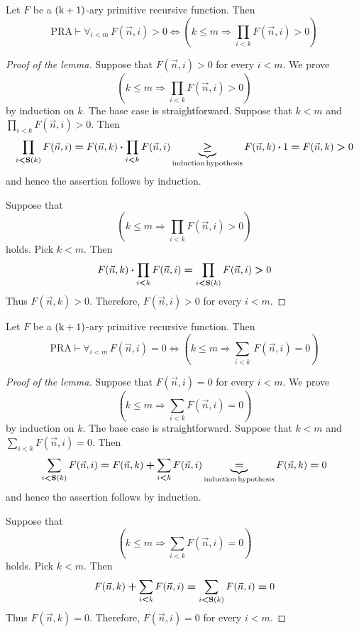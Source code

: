 \documentclass[10pt]{amsart}
\newcommand{\mforall}{\boldsymbol{\forall}}
\newcommand{\mra}{\boldsymbol{\Rightarrow}}
\newcommand{\mequiv}{\boldsymbol{\Leftrightarrow}}
\newcommand{\mle}{\boldsymbol{<}}
\newcommand{\mge}{\boldsymbol{>}}
\newcommand{\mleq}{\boldsymbol{\leq}}
\newcommand{\mgeq}{\boldsymbol{\geq}}
\newcommand{\meq}{\boldsymbol{=}}
\newcommand{\mplus}{\boldsymbol{+}}
\newcommand{\mdot}{\boldsymbol{\cdot}}
\begin{document}
\begin{lemma}\label{lemma:bounded_universal_quantifiers_and_cummulative_products}
	Let $F$ be a $\rm{(k + 1)}$-ary primitive recursive function. Then
  $$\mathrm{PRA}\vdash \mforall_{i \mle m}\,F(\vec{n},i) \mge 0 \mequiv \left(k \mleq m \mra \prod_{i \mle k}F(\vec{n},i) \mge 0\right)$$
\end{lemma}
\begin{proof}[Proof of the lemma]
	Suppose that $F(\vec{n},i) \mge 0$ for every $i \mle m$. We prove
	$$\left(k \mleq m \mra \prod_{i \mle k}F(\vec{n},i) \mge 0\right)$$
	by induction on $k$. The base case is straightforward. Suppose that $k \mle m$ and $\prod_{i \mle k}F(\vec{n},i) \mge 0$. Then
	$$\prod_{i \mle \bd{S}(k)}F(\vec{n},i) \meq F(\vec{n},k) \mdot \prod_{i \mle k}F(\vec{n},i) \underbrace{\mgeq}_{\mathrm{induction\,hypothesis}}F(\vec{n},k) \mdot 1 \meq F(\vec{n},k) \mge 0$$
	and hence the assertion follows by induction.

	Suppose that
	$$\left(k \mleq m \mra \prod_{i \mle k}F(\vec{n},i) \mge 0\right)$$
	holds. Pick $k \mle m$. Then
	$$F(\vec{n},k)\mdot \prod_{i \mle k} F(\vec{n},i) \meq \prod_{i \mle \bd{S}(k)}F(\vec{n},i) \mge 0$$
	Thus $F(\vec{n},k) \mge 0$. Therefore, $F(\vec{n},i) \mge 0$ for every $i \mle m$.
\end{proof}

\begin{lemma}\label{lemma:bounded_universal_quantifiers_and_cummulative_sums}
	Let $F$ be a $\rm{(k + 1)}$-ary primitive recursive function. Then
	$$\mathrm{PRA}\vdash \mforall_{i \mle m}\,F(\vec{n},i) \meq 0 \mequiv \left(k \mleq m \mra \sum_{i \mle k}\,F(\vec{n},i) \meq 0\right)$$
\end{lemma}
\begin{proof}[Proof of the lemma]
	Suppose that $F(\vec{n},i) \meq 0$ for every $i \mle m$. We prove
	$$\left(k \mleq m \mra \sum_{i \mle k}F(\vec{n},i) \meq 0\right)$$
	by induction on $k$. The base case is straightforward. Suppose that $k \mle m$ and $\sum_{i \mle k}F(\vec{n},i) \meq 0$. Then
	$$\sum_{i \mle \bd{S}(k)}F(\vec{n},i) \meq F(\vec{n},k) \mplus \sum_{i \mle k}F(\vec{n},i) \underbrace{\meq}_{\mathrm{induction\,hypothesis}}F(\vec{n},k) \meq 0$$
	and hence the assertion follows by induction.

	Suppose that
	$$\left(k \mleq m \mra \sum_{i \mle k}F(\vec{n},i) \meq 0\right)$$
	holds. Pick $k \mle m$. Then
	$$F(\vec{n},k) \mplus \sum_{i \mle k} F(\vec{n},i) \meq \sum_{i \mle \bd{S}(k)}F(\vec{n},i) \meq 0$$
	Thus $F(\vec{n},k) \meq 0$. Therefore, $F(\vec{n},i) \meq 0$ for every $i \mle m$.
\end{proof}
\end{document}
